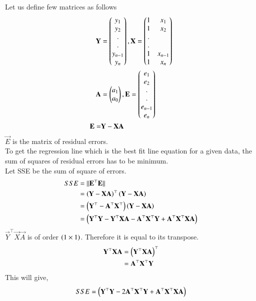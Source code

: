 \documentclass[journal,12pt,twocolumn]{IEEEtran}
\begin{document}
Let us define few matrices as follows\\
\begin{align}   
	      	\mathbf{Y}&=\begin{pmatrix}y_1\\y_2\\.\\.\\y_{n-1}\\y_n\end{pmatrix},
	      	\mathbf{X}=\begin{pmatrix}1&x_1\\1&x_2\\.&\\.&\\1&x_{n-1}\\1&x_n\end{pmatrix}
	      	\\
	      	\mathbf{A}&=\begin{pmatrix}a_1\\a_0\end{pmatrix},
	      	\mathbf{E}=\begin{pmatrix}e_1\\e_2\\.\\.\\e_{n-1}\\e_n\end{pmatrix}\\
      		\mathbf{E}=&\mathbf{Y}-\mathbf{X}\mathbf{A}
\end{align}
$ \vec{E}$ is the matrix of residual errors.\\
To get the regression line which is the best fit line equation for a given data, the sum of squares of residual errors has to be minimum.\\
Let SSE be the sum of square of errors.\\
\begin{align}
      	SSE&=\lVert\mathbf{E}^{\top}\mathbf{E}\rVert\\ &=\left(\mathbf{Y}-\mathbf{X}\mathbf{A}\right)^{\top}\left(\mathbf{Y}-\mathbf{X}\mathbf{A}\right)\\
      	&=\left(\mathbf{Y}^{\top}-\mathbf{A}^{\top}\mathbf{X}^{\top}\right)\left(\mathbf{Y}-\mathbf{X}\mathbf{A}\right)
      	\\
      	&=\left(\mathbf{Y}^{\top}\mathbf{Y}-\mathbf{Y}^{\top}\mathbf{X}\mathbf{A}-\mathbf{A}^{\top}\mathbf{X}^{\top}\mathbf{Y}+\mathbf{A}^{\top}\mathbf{X}^{\top}\mathbf{X}\mathbf{A}\right)
\end{align}
$ \vec{Y}^{\top}\vec{X}\vec{A} $ is of order $ \left(1 \times 1\right) $. Therefore it is equal to its transpose.
\begin{align}
    \mathbf{Y}^{\top}\mathbf{X}\mathbf{A} &= \left(\mathbf{Y}^{\top}\mathbf{X}\mathbf{A}\right)^{\top}\\
    &= \mathbf{A}^{\top}\mathbf{X}^{\top}\mathbf{Y}
\end{align}
This will give,
\begin{align}
    SSE = \left(\mathbf{Y}^{\top}\mathbf{Y}-2\mathbf{A}^{\top}\mathbf{X}^{\top}\mathbf{Y}+\mathbf{A}^{\top}\mathbf{X}^{\top}\mathbf{X}\mathbf{A}\right)
\end{align}\\
\end{document}
